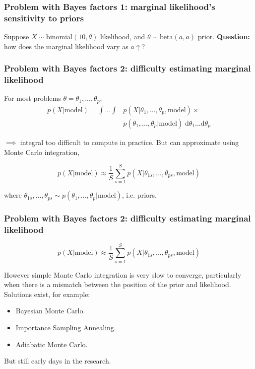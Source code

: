 \documentclass[handout]{beamer}
\begin{document}
\begin{frame}
	\frametitle{Problem with Bayes factors 1: marginal likelihood's sensitivity to priors}
	 Suppose $X\sim \text{binomial}(10,\theta)$ likelihood, and $\theta\sim \text{beta}(a,a)$ prior. \onslide<3-> \textbf{Question:} how does the marginal likelihood vary as $a\uparrow$?
	
	\begin{figure}[t]
		\centerline{}
	\end{figure}
	
\end{frame}

\begin{frame}
	\frametitle{Problem with Bayes factors 2: difficulty estimating marginal likelihood}
	 For most problems $\theta={\theta_1,...,\theta_p}$,\onslide<3->
	\begin{align}
	p(X|\text{model}) = \int...\int &p(X|\theta_1,...,\theta_p,\text{model}) \times\\
	& p(\theta_1,...,\theta_p|\text{model})\;\mathrm{d}\theta_1 ...\mathrm{d}\theta_p
	\end{align}
	
	 $\implies$ integral too difficult to compute in practice. \onslide<5-> But can approximate using Monte Carlo integration,
	
	\begin{equation}
	p(X|\text{model}) \approx \frac{1}{S}\sum_{s=1}^{S} p(X|\theta_{1s},...,\theta_{ps},\text{model})
	\end{equation}
	
	where $\theta_{1s},...,\theta_{ps}\sim p(\theta_1,...,\theta_p|\text{model})$, i.e. priors.

	
\end{frame}

\begin{frame}
	\frametitle{Problem with Bayes factors 2: difficulty estimating marginal likelihood}
	\begin{equation}
	p(X|\text{model})\approx \frac{1}{S}\sum_{s=1}^{S} p(X|\theta_{1s},...,\theta_{ps},\text{model})
	\end{equation}
	
		 However simple Monte Carlo integration is very slow to converge, particularly when there is a mismatch between the position of the prior and likelihood. \onslide<3-> Solutions exist, for example:
		
		\begin{itemize}
			\item<4-> Bayesian Monte Carlo.
			\item<5-> Importance Sampling Annealing.
			\item<6-> Adiabatic Monte Carlo.
		\end{itemize}
		
		But still early days in the research.
\end{frame}
\end{document}
